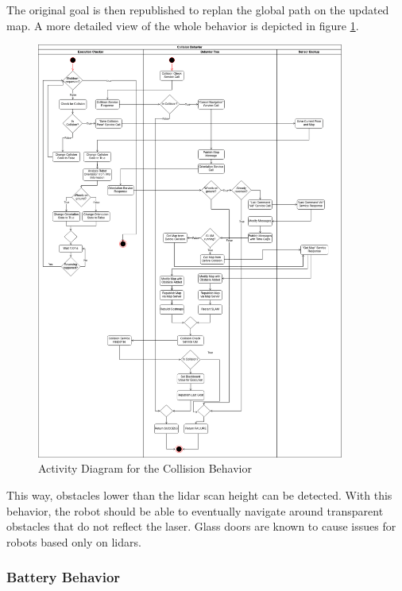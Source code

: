 %




The original goal is then republished to replan the global path on the updated map. A more detailed view of the whole behavior is depicted in figure \ref{fig:activity_diagram_collision}.

\begin{figure}[ht!]
	\centering
	\includegraphics[width=0.9\textwidth]{images/activity_diagram_collision.png}
	\caption{Activity Diagram for the Collision Behavior}
	\label{fig:activity_diagram_collision}
\end{figure}

This way, obstacles lower than the lidar scan height can be detected. With this behavior, the robot should be able to eventually navigate around transparent obstacles that do not reflect the laser. Glass doors are known to cause issues for robots based only on lidars. 

\subsubsection{Battery Behavior}

